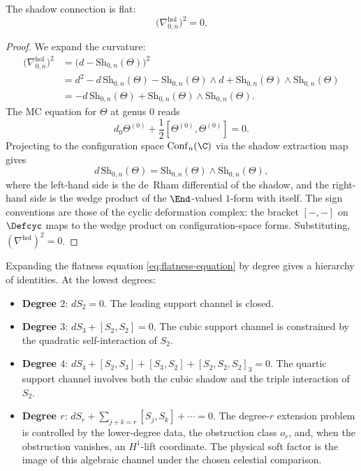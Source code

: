 \begin{theorem}
The shadow connection is flat:
\begin{equation}
\label{eq:flatness-equation}
\bigl(\nabla^{\mathrm{hol}}_{0,n}\bigr)^2 = 0.
\end{equation}
\end{theorem}

\begin{proof}
We expand the curvature:
\begin{align*}
\bigl(\nabla^{\mathrm{hol}}_{0,n}\bigr)^2
&= \bigl(d - \mathrm{Sh}_{0,n}(\Theta)\bigr)^2
\\
&= d^2 - d\,\mathrm{Sh}_{0,n}(\Theta) - \mathrm{Sh}_{0,n}(\Theta) \wedge d
 + \mathrm{Sh}_{0,n}(\Theta) \wedge \mathrm{Sh}_{0,n}(\Theta)
\\
&= -d\,\mathrm{Sh}_{0,n}(\Theta)
 + \mathrm{Sh}_{0,n}(\Theta) \wedge \mathrm{Sh}_{0,n}(\Theta).
\end{align*}
The MC equation for $\Theta$ at genus $0$ reads
\[
d_0 \Theta^{(0)} + \frac{1}{2}[\Theta^{(0)}, \Theta^{(0)}] = 0.
\]
Projecting to the configuration space $\mathrm{Conf}_n(\C)$ via the shadow
extraction map gives
\[
d\,\mathrm{Sh}_{0,n}(\Theta)
= \mathrm{Sh}_{0,n}(\Theta) \wedge \mathrm{Sh}_{0,n}(\Theta),
\]
where the left-hand side is the de~Rham differential of the shadow, and the
right-hand side is the wedge product of the $\End$-valued $1$-form with itself.
The sign conventions are those of the cyclic deformation complex: the bracket
$[-,-]$ on $\Defcyc$ maps to the wedge product on configuration-space forms.
Substituting, $(\nabla^{\mathrm{hol}})^2 = 0$.
\end{proof}

\begin{remark}
Expanding the flatness equation \eqref{eq:flatness-equation} by degree gives a
hierarchy of identities. At the lowest degrees:
\begin{itemize}
\item \textbf{Degree $2$}: $dS_2 = 0$. The leading support channel is closed.
\item \textbf{Degree $3$}: $dS_3 + [S_2, S_2] = 0$. The cubic support channel is
 constrained by the quadratic self-interaction of $S_2$.
\item \textbf{Degree $4$}: $dS_4 + [S_2, S_3] + [S_3, S_2] + [S_2, S_2, S_2]_3 = 0$.
 The quartic support channel involves both the cubic shadow and the triple interaction
 of $S_2$.
\item \textbf{Degree $r$}: $dS_r + \sum_{j+k=r} [S_j, S_k] + \cdots = 0$. The degree-$r$
 extension problem is controlled by the lower-degree data, the obstruction
 class \(o_r\), and, when the obstruction vanishes, an \(H^1\)-lift
 coordinate.  The physical soft factor is the image of this algebraic
 channel under the chosen celestial comparison.
\end{itemize}
\end{remark}

